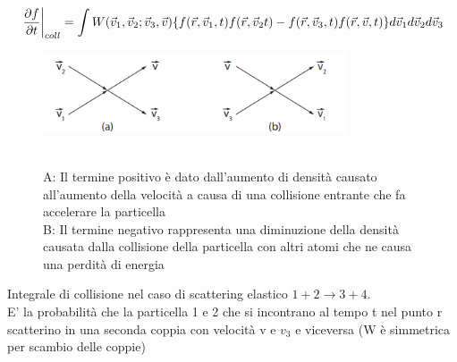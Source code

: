 \begin{note}
    \[\left.\frac{\partial f}{\partial t}\right\vert_{coll}^{}=\int W(\vec{v}_1,\vec{v} _{2} ;\vec{v} _{3}, \vec{v}) \{ f(\vec{r} ,\vec{v} _{1} ,t)f(\vec{r} , \vec{v} _{2} t)-f(\vec{r} ,\vec{v} _{3},t) f(\vec{r} ,\vec{v} ,t)\} d \vec{v} _{1} d \vec{v} _{2} d \vec{v} _{3}   \]


\begin{figure}[H]
    \centering
    \includegraphics[width=0.8\textwidth,frame]{Chapters/images/Interazione_radiazione_materia/image-20220222100641937.png}
\end{figure}
    \hspace{-15pt}
    \begin{minipage}{0.48\textwidth}
        \begin{figure}[H]
            \centering

            \captionsetup{width=\textwidth}
            \caption{\\
            A: Il termine positivo è dato dall'aumento di densità causato all'aumento della velocità a causa di una collisione entrante che fa accelerare la particella \\
            B: Il termine negativo rappresenta una  diminuzione della densità causata dalla collisione della particella con altri atomi che ne causa una perdità di energia}
            \label{fig:}
        \end{figure}
    \end{minipage} \hspace{20pt}
    \begin{minipage}{0.4\textwidth}
    
        Integrale di collisione nel caso di scattering elastico $1+2\to3+4$.\\
         E' la probabilità che la particella 1 e 2 che si incontrano al tempo t nel punto r scatterino in una seconda coppia con velocità v e $v_3$ e viceversa (W è simmetrica per scambio delle coppie)
    
    \end{minipage}
\end{note}

